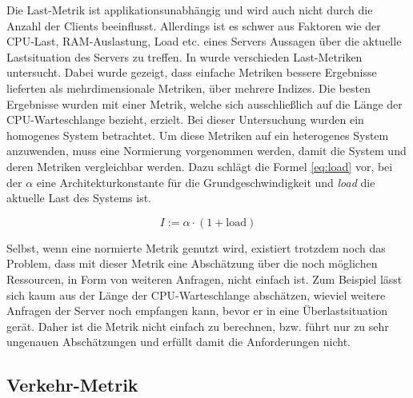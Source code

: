 \documentclass[a4paper, 12pt, BCOR10mm, DIV12, toc=bibliography, toc=listof, german]{scrbook}
\begin{document}
		Die Last-Metrik ist applikationsunabhängig und wird auch nicht durch die Anzahl der Clients
		beeinflusst. Allerdings ist es schwer aus Faktoren wie der CPU-Last, RAM-Auslastung, Load etc.
		eines Servers Aussagen über die aktuelle Lastsituation des Servers zu treffen. In
		\cite{kunz1991} wurde verschieden Last-Metriken untersucht. Dabei wurde gezeigt, dass einfache
		Metriken bessere Ergebnisse lieferten als mehrdimensionale Metriken, über mehrere Indizes. Die
		besten Ergebnisse wurden mit einer Metrik, welche sich ausschließlich auf die Länge der
		CPU-Warteschlange bezieht, erzielt. Bei dieser Untersuchung wurden ein homogenes System
		betrachtet. Um diese Metriken auf ein heterogenes System anzuwenden, muss eine Normierung
		vorgenommen werden, damit die System und deren Metriken vergleichbar werden. Dazu schlägt
		\cite{lansch1994} die Formel \ref{eq:load} vor, bei der $\alpha$ eine Architekturkonstante für
		die Grundgeschwindigkeit und \textit{load} die aktuelle Last des Systems ist.

		\begin{equation}
			I := \alpha \cdot (1 + \text{load})
			\label{eq:load}
		\end{equation}

		Selbst, wenn eine normierte Metrik genutzt wird, existiert trotzdem noch das Problem, dass mit
		dieser Metrik eine Abschätzung über die noch möglichen Ressourcen, in Form von weiteren
		Anfragen, nicht einfach ist. Zum Beispiel lässt sich kaum aus der Länge der CPU-Warteschlange
		abschätzen, wieviel weitere Anfragen der Server noch empfangen kann, bevor er in eine
		Überlastsituation gerät. Daher ist die Metrik nicht einfach zu berechnen, bzw. führt nur zu sehr
		ungenauen Abschätzungen und erfüllt damit die Anforderungen nicht.


		\subsection*{Verkehr-Metrik} %
\end{document}
